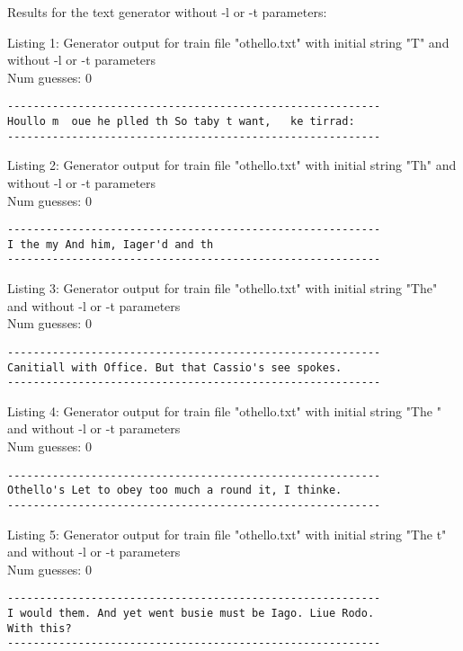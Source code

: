 \documentclass{article}
\begin{document}
Results for the text generator without -l or -t parameters:

\hfill

Listing 1: Generator output for train file "othello.txt" with initial string "T" and without -l or -t parameters
\\Num guesses: 0

\begin{lstlisting}
----------------------------------------------------------
Houllo m  oue he plled th So taby t want,   ke tirrad:
----------------------------------------------------------
\end{lstlisting}

Listing 2: Generator output for train file "othello.txt" with initial string "Th" and without -l or -t parameters
\\Num guesses: 0

\begin{lstlisting}
----------------------------------------------------------
I the my And him, Iager'd and th
----------------------------------------------------------
\end{lstlisting}

Listing 3: Generator output for train file "othello.txt" with initial string "The" and without -l or -t parameters
\\Num guesses: 0

\begin{lstlisting}
----------------------------------------------------------
Canitiall with Office. But that Cassio's see spokes.
----------------------------------------------------------
\end{lstlisting}

Listing 4: Generator output for train file "othello.txt" with initial string "The " and without -l or -t parameters
\\Num guesses: 0

\begin{lstlisting}
----------------------------------------------------------
Othello's Let to obey too much a round it, I thinke.
----------------------------------------------------------
\end{lstlisting}

Listing 5: Generator output for train file "othello.txt" with initial string "The t" and without -l or -t parameters
\\Num guesses: 0

\begin{lstlisting}
----------------------------------------------------------
I would them. And yet went busie must be Iago. Liue Rodo. 
With this?
----------------------------------------------------------
\end{lstlisting}
\end{document}

